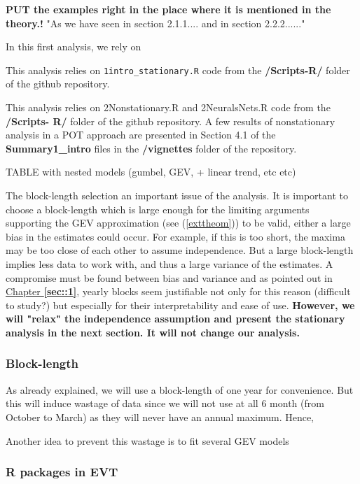 \textbf{PUT the examples right in the place where it is mentioned in the theory.!} 
"As we have seen in section 2.1.1.... and in section 2.2.2......"

In this first analysis, we rely on 

This analysis relies on \texttt{1intro\_stationary.R} code from the \textbf{/Scripts-R/} folder of the github repository.

This analysis relies on 2Nonstationary.R and 2NeuralsNets.R code from the\textbf{ /Scripts-
R/} folder of the github repository. A few results of nonstationary analysis in a POT approach are
presented in Section 4.1 of the \textbf{Summary1\_intro} files in the \textbf{/vignettes} folder of the repository. 

TABLE with nested models (gumbel, GEV, + linear trend, etc etc)


The block-length selection an important issue of the analysis. It is important to choose a block-length which is large enough for the limiting arguments supporting the GEV approximation (see (\ref{exttheom})) to be valid, either a large bias in the estimates could occur. For example, if this is too short, the maxima may be too close of each other to assume independence. But a large block-length implies less data to work with, and thus a large variance of the estimates. A compromise must be found between bias and variance and as pointed out in \hyperref[sec::1]{Chapter \textbf{\ref{sec::1}}}, yearly blocks seem justifiable not only for this reason (difficult to study?) but especially for their interpretability and ease of use.
\textbf{However, we will "relax" the independence assumption and present the stationary analysis in the next section. It will not change our analysis.}


\subsubsection*{Block-length } 

As already explained, we will use a block-length of one year for convenience. 
But this will induce wastage of data since we will not use at all 6 month (from October to March) as they will never have an annual maximum. Hence,

Another idea to prevent this wastage is to fit several GEV models 


\subsubsection*{R packages in EVT}

